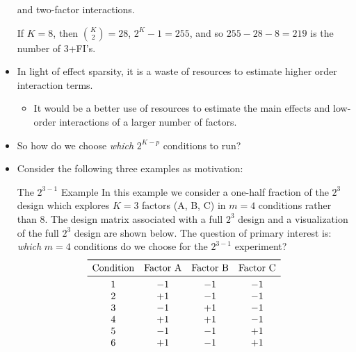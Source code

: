 \begin{itemize}
            and two-factor interactions.
            \begin{Example}{}{}
                  If $ K=8 $, then $ \binom{K}{2}=28 $, $ 2^K-1=255 $, and so $ 255-28-8=219 $ is the number of 3+FI's.
            \end{Example}
      \item In light of effect sparsity, it is a waste of resources to estimate higher order interaction terms.
            \begin{itemize}[*]
                  \item It would be a better use of resources to estimate the main effects and low-order interactions of a
                        larger number of factors.
            \end{itemize}
      \item So how do we choose \emph{which} $ 2^{K-p} $ conditions to run?
      \item Consider the following three examples as motivation:
            \begin{Example}{The $ 2^{3-1} $ Example}{}
                  In this example we consider a one-half fraction of the $2^3$ design which
                  explores $K = 3$ factors (A, B, C) in $m = 4$ conditions rather than $8$. The design matrix associated
                  with a full $2^3$ design and a visualization of the full $2^3$ design are shown below. The question of
                  primary interest is: \emph{which} $m = 4$ conditions do we choose for the $ 2^{3-1} $ experiment?
                  \[ \begin{array}{cccc}
                              \toprule
                              \text{Condition} & \text{Factor A} & \text{Factor B} & \text{Factor C} \\
                              \midrule
                              1                & -1              & -1              & -1              \\
                              2                & +1              & -1              & -1              \\
                              3                & -1              & +1              & -1              \\
                              4                & +1              & +1              & -1              \\
                              5                & -1              & -1              & +1              \\
                              6                & +1              & -1              & +1              \\

\end{array}\]
\end{Example}
\end{itemize}
